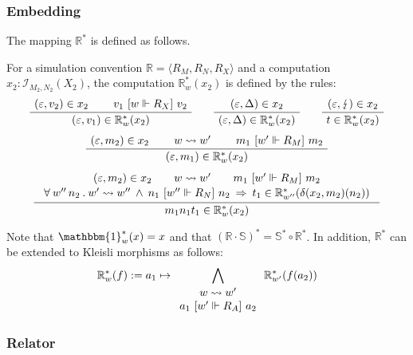 \subsubsection{Embedding}

The mapping $\mathbb{R}^*$ is defined as follows.

\begin{definition}
For a simulation convention $\mathbb{R} = \langle R_M, R_N, R_X \rangle$
and a computation $x_2 : \mathcal{I}_{M_2, N_2}(X_2)$,
the computation $\mathbb{R}^*_w(x_2)$ is defined by the rules:
\begin{gather*}
  \AxiomC{$(\varepsilon, v_2) \in x_2$}
  \AxiomC{$v_1 \ifr{w \Vdash R_X} v_2$}
  \BinaryInfC{$(\varepsilon, v_1) \in \mathbb{R}^*_w(x_2)$}
  \DisplayProof
  \qquad
  \AxiomC{$(\varepsilon, \Delta) \in x_2$}
  \UnaryInfC{$(\varepsilon, \Delta) \in \mathbb{R}^*_w(x_2)$}
  \DisplayProof
  \qquad
  \AxiomC{$(\varepsilon, \lightning) \in x_2$}
  \UnaryInfC{$t \in \mathbb{R}^*_w(x_2)$}
  \DisplayProof
  \\[1ex]
  \AxiomC{$(\varepsilon, m_2) \in x_2$}
  \AxiomC{$w \leadsto w'$}
  \AxiomC{$m_1 \ifr{w' \Vdash R_M} m_2$}
  \TrinaryInfC{$(\varepsilon, m_1) \in \mathbb{R}^*_w(x_2)$}
  \DisplayProof
  \\[1ex]
  \AxiomC{$
    \begin{array}{c}
      (\varepsilon, m_2) \in x_2 \qquad
      w \leadsto w' \qquad
      m_1 \ifr{w' \Vdash R_M} m_2
      \\[.3ex]
      \forall \: w'' \, n_2 \:.\:
        w' \leadsto w'' \: \wedge \:
        n_1 \ifr{w'' \Vdash R_N} n_2 \: \Rightarrow \:
        t_1 \in \mathbb{R}^*_{w''}(\delta(x_2, m_2)(n_2))
    \end{array}$}
  \UnaryInfC{$m_1 n_1 t_1 \in \mathbb{R}^*_w(x_2)$}
  \DisplayProof
\end{gather*}
\end{definition}

Note that $\mathbbm{1}^*_w(x) = x$
and that $(\mathbb{R} \cdot \mathbb{S})^* = \mathbb{S}^* \circ \mathbb{R}^*$.
In addition,
$\mathbb{R}^*$ can be extended to Kleisli morphisms as follows:
\[
    \mathbb{R}^*_w(f) :=
       a_1 \mapsto \bigwedge_{
         \begin{array}{c}
           w \leadsto w' \\
           a_1 \ [{w' \Vdash R_A}]\  a_2
         \end{array}}
         \mathbb{R}^*_{w'}(f(a_2))
\]

\subsubsection{Relator}

